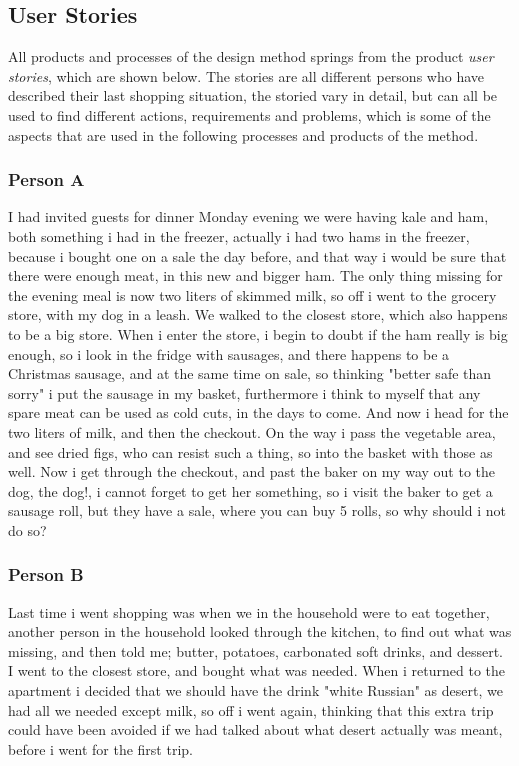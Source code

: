 \subsection{User Stories} \label{UserStories}
All products and processes of the design method springs from the product \textit{user stories}, which are shown below. The stories are all different persons who have described their last shopping situation, the storied vary in detail, but can all be used to find different actions, requirements and problems, which is some of the aspects that are used in the following processes and products of the method.

\subsubsection{Person A}
I had invited guests for dinner Monday evening we were having kale and ham, both something i had in the freezer, actually i had two hams in the freezer, because i bought one on a sale the day before, and that way i would be sure that there were enough meat, in this new and bigger ham. The only thing missing for the evening meal is now two liters of skimmed milk, so off i went to the grocery store, with my dog in a leash. We walked to the closest store, which also happens to be a big store. When i enter the store, i begin to doubt if the ham really is big enough, so i look in the fridge with sausages, and there happens to be a Christmas sausage, and at the same time on sale, so thinking "better safe than sorry" i put the sausage in my basket, furthermore i think to myself that any spare meat can be used as cold cuts, in the days to come. And now i head for the two liters of milk, and then the checkout. On the way i pass the vegetable area, and see dried figs, who can resist such a thing, so into the basket with those as well. Now i get through the checkout, and past the baker on my way out to the dog, the dog!, i cannot forget to get her something, so i visit the baker to get a sausage roll, but they have a sale, where you can buy 5 rolls, so why should i not do so?

\subsubsection{Person B}
Last time i went shopping was when we in the household were to eat together, another person in the household looked through the kitchen, to find out what was missing, and then told me; butter, potatoes, carbonated soft drinks, and dessert. I went to the closest store, and bought what was needed. When i returned to the apartment i decided that we should have the drink "white Russian" as desert, we had all we needed except milk, so off i went again, thinking that this extra trip could have been avoided if we had talked about what desert actually was meant, before i went for the first trip.
 
